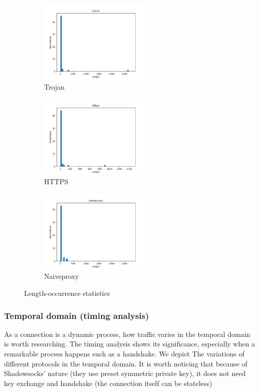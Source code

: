 \documentclass[conference]{IEEEtran}
\begin{document}
\begin{figure}[H]
    \centering
    \begin{subfigure}[b]{0.40\textwidth}
        \includegraphics[width=\textwidth, height=4cm]{pics/occurrence_of_length_trojan.png}
        \caption{Trojan}
    \end{subfigure}
    \hfill
    \begin{subfigure}[b]{0.40\textwidth}
        \includegraphics[width=\textwidth, height=4cm]{pics/occurrence_of_length_https.png}
        \caption{HTTPS}
    \end{subfigure}
    \hfill
    \begin{subfigure}[b]{0.40\textwidth}
        \includegraphics[width=\textwidth, height=4cm]{pics/occurrence_of_length_naiveproxy.png}
        \caption{Naiveproxy}
    \end{subfigure}
    \caption{Length-occurrence statistics}
\end{figure}

\subsubsection{Temporal domain (timing analysis)}
As a connection is a dynamic process, how traffic varies in the temporal domain is worth researching. The timing analysis shows its significance, especially when a remarkable process happens such as a handshake.
We depict The variations of different protocols in the temporal domain. It is worth noticing that because of Shadowsocks' nature (they use preset symmetric private key), it does not need key exchange and handshake (the connection itself can be stateless)
\end{document}
